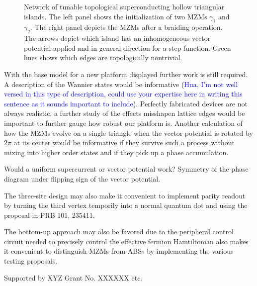 \documentclass[aps,prb,showpacs,amsmath,twocolumn,amssymb,superscriptaddress]{revtex4-2}
\newcommand{\Blue}[1]{\textcolor{blue}{#1}}
\begin{document}
\begin{figure}[]
  \caption{Network of tunable topological superconducting hollow triangular islands. The left panel shows the initialization of two MZMs $\gamma_1$ and $\gamma_2$. The right panel depicts the MZMs after a braiding operation. The arrows depict which island has an inhomogeneous vector potential applied and in general direction for a step-function. Green lines shows which edges are topologically nontrivial.}
  \label{fig: triangular-network-braiding}
\end{figure}

With the base model for a new platform displayed further work is still required.
A description of the Wannier states would be informative (\Blue{Hua, I'm not well versed in this type of description, could use your expertise here in writing this sentence as it sounds important to include}).
Perfectly fabricated devices are not always realistic, a further study of the effects misshapen lattice edges would be important to further gauge how robust our platform is.
Another calculation of how the MZMs evolve on a single triangle when the vector potential is rotated by $2\pi$ at its center would be informative if they survive such a process without mixing into higher order states and if they pick up a phase accumulation.

Would a uniform supercurrent or vector potential work?  Symmetry of the phase diagram under flipping sign of the vector potential. 

The three-site design may also make it convenient to implement parity readout by turning the third vertex temporily into a normal quantum dot and using the proposal in PRB 101, 235411. 

The bottom-up approach may also be favored due to the peripheral control circuit needed to precisely control the effective fermion Hamtiltonian also makes it convenient to distinguish MZMs from ABSs by implementing the various testing proposals.

\begin{acknowledgements}
  Supported by XYZ Grant No. XXXXXX etc.
\end{acknowledgements}



\end{document}

